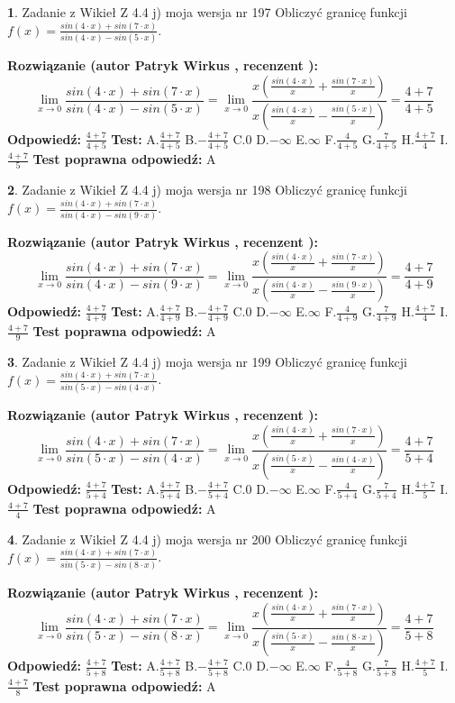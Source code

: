 \documentclass[12pt, a4paper]{article}
\theoremstyle{definition} %
\newtheorem{zad}{}
\newcommand{\zadStart}[1]{\begin{zad}#1\newline}
\newcommand{\zadStop}{\end{zad}}
\newcommand{\rozwStart}[2]{\noindent \textbf{Rozwiązanie (autor #1 , recenzent #2): }\newline}
\newcommand{\rozwStop}{\newline}
\newcommand{\odpStart}{\noindent \textbf{Odpowiedź:}\newline}
\newcommand{\odpStop}{\newline}
\newcommand{\testStart}{\noindent \textbf{Test:}\newline}
\newcommand{\testStop}{\newline}
\newcommand{\kluczStart}{\noindent \textbf{Test poprawna odpowiedź:}\newline}
\newcommand{\kluczStop}{\newline}
\begin{document}
\zadStart{Zadanie z Wikieł Z 4.4 j) moja wersja nr 197}
Obliczyć granicę funkcji $f(x)=\frac{sin(4\cdot x) +sin(7\cdot x)}{sin(4\cdot x) -sin(5\cdot x)}$.
\zadStop
\rozwStart{Patryk Wirkus}{}
$$\lim\limits_{x\to 0}\frac{sin(4\cdot x) +sin(7\cdot x)}{sin(4\cdot x) -sin(5\cdot x)}=\lim\limits_{x\to 0}\frac{x(\frac{sin(4\cdot x)}{x}+\frac{sin(7\cdot x)}{x})}{x(\frac{sin(4\cdot x)}{x}-\frac{sin(5\cdot x)}{x})}=\frac{4+7}{4+5}$$
\rozwStop
\odpStart
$\frac{4+7}{4+5}$
\odpStop
\testStart
A.$\frac{4+7}{4+5}$
B.$-\frac{4+7}{4+5}$
C.$0$
D.$-\infty$
E.$\infty$
F.$\frac{4}{4+5}$
G.$\frac{7}{4+5}$
H.$\frac{4+7}{4}$
I.$\frac{4+7}{5}$
\testStop
\kluczStart
A
\kluczStop



\zadStart{Zadanie z Wikieł Z 4.4 j) moja wersja nr 198}
Obliczyć granicę funkcji $f(x)=\frac{sin(4\cdot x) +sin(7\cdot x)}{sin(4\cdot x) -sin(9\cdot x)}$.
\zadStop
\rozwStart{Patryk Wirkus}{}
$$\lim\limits_{x\to 0}\frac{sin(4\cdot x) +sin(7\cdot x)}{sin(4\cdot x) -sin(9\cdot x)}=\lim\limits_{x\to 0}\frac{x(\frac{sin(4\cdot x)}{x}+\frac{sin(7\cdot x)}{x})}{x(\frac{sin(4\cdot x)}{x}-\frac{sin(9\cdot x)}{x})}=\frac{4+7}{4+9}$$
\rozwStop
\odpStart
$\frac{4+7}{4+9}$
\odpStop
\testStart
A.$\frac{4+7}{4+9}$
B.$-\frac{4+7}{4+9}$
C.$0$
D.$-\infty$
E.$\infty$
F.$\frac{4}{4+9}$
G.$\frac{7}{4+9}$
H.$\frac{4+7}{4}$
I.$\frac{4+7}{9}$
\testStop
\kluczStart
A
\kluczStop



\zadStart{Zadanie z Wikieł Z 4.4 j) moja wersja nr 199}
Obliczyć granicę funkcji $f(x)=\frac{sin(4\cdot x) +sin(7\cdot x)}{sin(5\cdot x) -sin(4\cdot x)}$.
\zadStop
\rozwStart{Patryk Wirkus}{}
$$\lim\limits_{x\to 0}\frac{sin(4\cdot x) +sin(7\cdot x)}{sin(5\cdot x) -sin(4\cdot x)}=\lim\limits_{x\to 0}\frac{x(\frac{sin(4\cdot x)}{x}+\frac{sin(7\cdot x)}{x})}{x(\frac{sin(5\cdot x)}{x}-\frac{sin(4\cdot x)}{x})}=\frac{4+7}{5+4}$$
\rozwStop
\odpStart
$\frac{4+7}{5+4}$
\odpStop
\testStart
A.$\frac{4+7}{5+4}$
B.$-\frac{4+7}{5+4}$
C.$0$
D.$-\infty$
E.$\infty$
F.$\frac{4}{5+4}$
G.$\frac{7}{5+4}$
H.$\frac{4+7}{5}$
I.$\frac{4+7}{4}$
\testStop
\kluczStart
A
\kluczStop



\zadStart{Zadanie z Wikieł Z 4.4 j) moja wersja nr 200}
Obliczyć granicę funkcji $f(x)=\frac{sin(4\cdot x) +sin(7\cdot x)}{sin(5\cdot x) -sin(8\cdot x)}$.
\zadStop
\rozwStart{Patryk Wirkus}{}
$$\lim\limits_{x\to 0}\frac{sin(4\cdot x) +sin(7\cdot x)}{sin(5\cdot x) -sin(8\cdot x)}=\lim\limits_{x\to 0}\frac{x(\frac{sin(4\cdot x)}{x}+\frac{sin(7\cdot x)}{x})}{x(\frac{sin(5\cdot x)}{x}-\frac{sin(8\cdot x)}{x})}=\frac{4+7}{5+8}$$
\rozwStop
\odpStart
$\frac{4+7}{5+8}$
\odpStop
\testStart
A.$\frac{4+7}{5+8}$
B.$-\frac{4+7}{5+8}$
C.$0$
D.$-\infty$
E.$\infty$
F.$\frac{4}{5+8}$
G.$\frac{7}{5+8}$
H.$\frac{4+7}{5}$
I.$\frac{4+7}{8}$
\testStop
\kluczStart
A
\kluczStop
\end{document}
